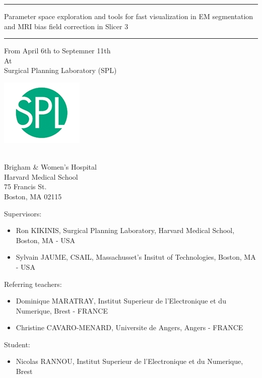 \documentclass[a4paper,11pt]{report}
\begin{document}
\begin{titlepage}
\begin{center}
\begin{center}
\begin{minipage}[c]{0.3\textwidth}
\end{minipage}
\end{center}

\bigskip
\bigskip
\bigskip

\hrule
\bigskip
\begin{minipage}{1\textwidth}
\begin{center}\begin{LARGE} Parameter space exploration and tools for fast visualization in EM segmentation and MRI bias field correction in Slicer 3
\end{LARGE}\end{center}
\end{minipage}
\bigskip
\hrule

\bigskip
\bigskip
\bigskip

\begin{small}From April 6th to Septemner 11th \\ 
At \\ 
Surgical Planning Laboratory (SPL)
\end{small}

\includegraphics[width=.3\textwidth]{Images/Logos/logo_spl.jpg}
\begin{small}\\Brigham \& Women's Hospital\\
 Harvard Medical School \\
 75 Francis St. \\
 Boston, MA 02115\end{small}
\end{center}

\begin{flushleft}
\begin{small}
Supervisors:
\begin{itemize}
\item Ron KIKINIS, Surgical Planning Laboratory, Harvard Medical School, Boston, MA - USA
\item Sylvain JAUME, CSAIL, Massachusset's Insitut of Technologies, Boston, MA - USA
\end{itemize}
Referring teachers:
\begin{itemize}
\item Dominique MARATRAY, Institut Superieur de l'Electronique et du Numerique, Brest - FRANCE
\item Christine CAVARO-MENARD, Universite de Angers, Angers - FRANCE
\end{itemize}
Student:
\begin{itemize}
\item Nicolas RANNOU, Institut Superieur de l'Electronique et du Numerique, Brest
\end{itemize}
\end{small}
\end{flushleft}

\end{titlepage}
\end{document}
